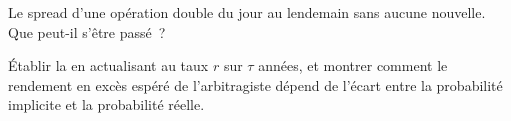 \begin{interviewq}\label{iq:s1:merger-arbitrage:5}
Le spread d'une opération double du jour au lendemain sans aucune nouvelle. Que peut-il s'être passé~?
\end{interviewq}

\begin{interviewq}\label{iq:s1:merger-arbitrage:6}
Établir la  en actualisant au taux $r$ sur $\tau$ années, et montrer comment le rendement en excès espéré de l'arbitragiste dépend
de l'écart entre la probabilité implicite et la probabilité réelle.
\end{interviewq}
